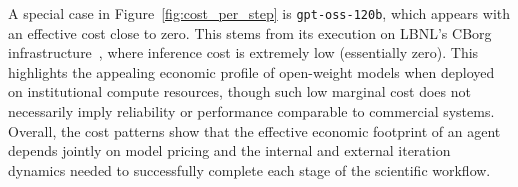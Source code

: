 \documentclass[aps,prd,reprint,superscriptaddress]{revtex4-2}
\begin{document}
A special case in Figure~\ref{fig:cost_per_step} is \texttt{gpt-oss-120b}, which appears with an effective cost close to zero. This stems from its execution on LBNL’s CBorg infrastructure~\citep{cborg}, where inference cost is extremely low (essentially zero). This highlights the appealing economic profile of open-weight models when deployed on institutional compute resources, though such low marginal cost does not necessarily imply reliability or performance comparable to commercial systems. Overall, the cost patterns show that the effective economic footprint of an agent depends jointly on model pricing and the internal and external iteration dynamics needed to successfully complete each stage of the scientific workflow.
\end{document}
